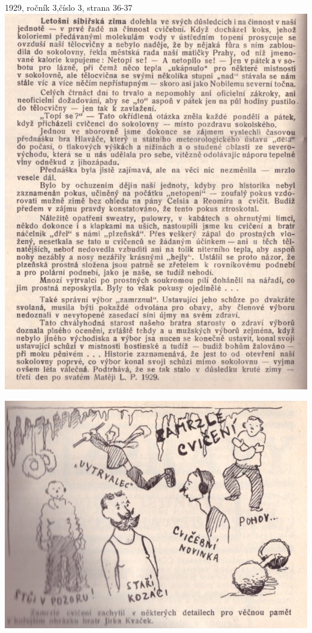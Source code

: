 \documentclass[11pt]{article}
\begin{document}
1929, ročník 3,číslo 3, strana 36-37 \\
\includegraphics[width=\imagewidth]{original/1929/Skener_20250318 (11).jpg}

\includegraphics[width=\imagewidth]{original/1929/Skener_20250318 (12).jpg}
\end{document}
